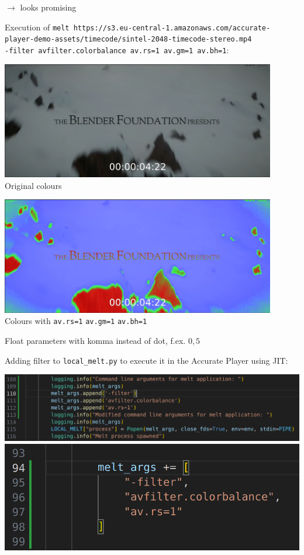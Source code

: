 \documentclass[12pt,a4paper]{article}
\begin{document}
\begin{itemize}
		$\rightarrow$ looks promising
		
		
		Execution of \texttt{melt https://s3.eu-central-1.amazonaws.com/accurate-player\--demo-assets/timecode/sintel-2048-timecode-stereo.mp4 \\ -filter avfilter.colorbalance av.rs=1 av.gm=1 av.bh=1}:
		
		
		\begin{minipage}{0.5\textwidth}
			\includegraphics[width=0.9\textwidth]{colourdefault.png}
			Original colours
		\end{minipage}\begin{minipage}{0.5\textwidth}
			\includegraphics[width=0.9\textwidth]{colourhigh.png}
			Colours with \texttt{av.rs=1} \texttt{av.gm=1} \texttt{av.bh=1}
		\end{minipage}
		
		Float parameters with komma instead of dot, f.ex. $0,5$
		
		Adding filter to \texttt{local\_melt.py} to execute it in the Accurate Player using JIT:
		
		\begin{center}
			\includegraphics[height=0.13\linewidth]{code.png}
			\includegraphics[height=0.13\linewidth]{codecleaner.png}
		\end{center}
		

\end{itemize}
\end{document}
